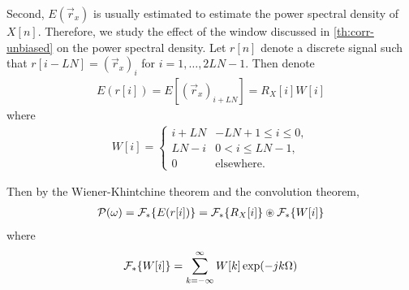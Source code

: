 \documentclass[a4paper, openany, oneside]{memoir}
\begin{document}
Second, $E(\vec{r}_x)$ is usually estimated to estimate the power spectral density of $X[n]$. Therefore, we study the effect of the window discussed in \cref{th:corr-unbiased} on the power spectral density. Let $r[n]$ denote a discrete signal such that $r[i - LN] = (\vec{r}_x)_i$ for $i = 1,\ldots,2LN-1$. Then denote
\begin{align*}
    E(r[i])=E[(\vec{r}_x)_{i + LN}]=R_X[i] W[i]
\end{align*}
where
\begin{align*}
    W[i] = \begin{cases}
        i+LN  & -LN+1 \le i \le 0, \\
        LN-i& 0 < i \le LN-1, \\
        0 & \text{elsewhere.}
    \end{cases}
\end{align*}

Then by the Wiener-Khintchine theorem and the convolution theorem,
\begin{align*}
    \mathcal{P}(\omega)=\mathcal{F}_*\{E(r[i])\} = \mathcal{F}_*\{R_X[i]\} \circledast \mathcal{F}_*\{W[i]\}
\end{align*}
where
\begin{align*}
    \mathcal{F}_*\{W[i]\} = \sum_{k=-\infty}^{\infty}W[k]\exp(-j k \Omega)
\end{align*}



\backmatter
{}
\printbibliography
\end{document}
